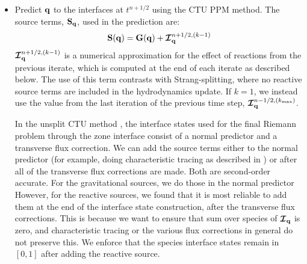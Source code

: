 \documentclass[linenumbers,trackchanges]{aastex631}
\newcommand{\Ic}{{\boldsymbol{\mathcal{I}}}}
\newcommand{\kmax}{{k_\mathrm{max}}}
\newcommand{\Sc}{\mathbf{S}}
\newcommand{\Sq}{{\bf S}_\qb}
\newcommand{\Sqhydro}{{\Sq^{\mathrm{hydro}}}}
\newcommand{\qb}{{\bf q}}
\newcommand{\Gb}{{\bf G}}
\newcommand{\MarginPar}[1]{\marginpar{\vskip-\baselineskip\raggedright\tiny\sffamily\hrule\smallskip{\color{red}#1}\par\smallskip\hrule}}
\begin{document}
\begin{itemize}
\begin{itemize}
\begin{itemize}
    \item Predict $\qb$ to the interfaces at $t^{n+1/2}$ using the CTU
      PPM method.  The source
      terms, $\Sq$, used in the prediction are:
      \begin{equation}
        \Sc(\qb) = \Gb(\qb) + \Ic_\qb^{n+1/2,(k-1)}
      \end{equation}
      $\Ic_\qb^{n+1/2,(k-1)}$ is a numerical approximation for the effect of
      reactions from the previous iterate, which is computed at the end of each iterate 
      as described below.
      The use of this term contrasts with Strang-splitting, where no
      reactive source terms are included in the hydrodynamics update.
      If $k=1$, we instead use the value from the last iteration of the previous
      time step, $\Ic^{n-1/2,(\kmax)}_{\qb}$.

      In the unsplit CTU method \citep{ppmunsplit}, the interface
      states used for the final Riemann problem through the zone
      interface consist of a normal predictor and a transverse flux
      correction.  We can add the source terms either to the normal
      predictor (for example, doing characteristic tracing as
      described in \citealt{ppm}) or after all of the transverse flux
      corrections are made.  Both are second-order accurate.  For the
      gravitational sources, we do those in the normal predictor
      However, for the reactive sources, we found that it is most
      reliable to add them at the end of the interface state
      construction, after the transverse flux corrections.  This is
      because we want to ensure that sum over species of $\Ic_\qb$ is
      zero, and characteristic tracing or the various flux corrections
      in general do not preserve this.  We enforce that the species interface
      states remain in $[0, 1]$ after adding the reactive source.



\end{itemize}
\end{itemize}
\end{itemize}
\end{document}
